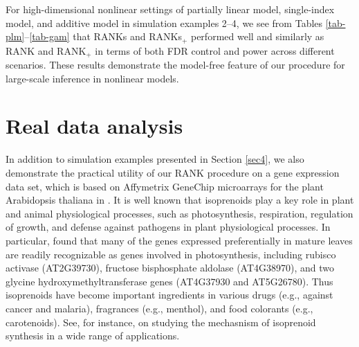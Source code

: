 \documentclass[11pt]{article}
\begin{document}
For high-dimensional nonlinear settings of partially linear model, single-index model, and additive model in simulation examples 2--4, we see from Tables \ref{tab-plm}--\ref{tab-gam} that RANKs and RANKs$_+$ performed well and similarly as RANK and RANK$_+$  in terms of both FDR control and power across different scenarios.   These results demonstrate the  model-free feature of our procedure for large-scale inference in nonlinear models.  


\section{Real data analysis} \label{sec5}

In addition to simulation examples presented in Section \ref{sec4}, we also demonstrate the practical utility of our RANK procedure on a gene expression data set, which is based on Affymetrix GeneChip microarrays for the plant Arabidopsis thaliana  in \cite{Wille2004}. It is well known that isoprenoids play a key role in plant and animal physiological processes, such as  photosynthesis,  respiration, regulation of growth, and defense against pathogens in plant physiological processes.
In particular, \cite{Horvath2003} found that many of the genes expressed preferentially
in mature leaves  are readily recognizable as genes
involved in photosynthesis, including  rubisco activase (AT2G39730), fructose bisphosphate aldolase
(AT4G38970), and two glycine hydroxymethyltransferase
genes (AT4G37930 and AT5G26780).  Thus isoprenoids have become important ingredients in various drugs (e.g., against cancer and malaria), fragrances (e.g., menthol), and food colorants (e.g., carotenoids). See, for instance, \cite{Wille2004, Schafer2005, Prelic2006} on studying the mechasnism of isoprenoid synthesis in a wide range of applications.
\end{document}
